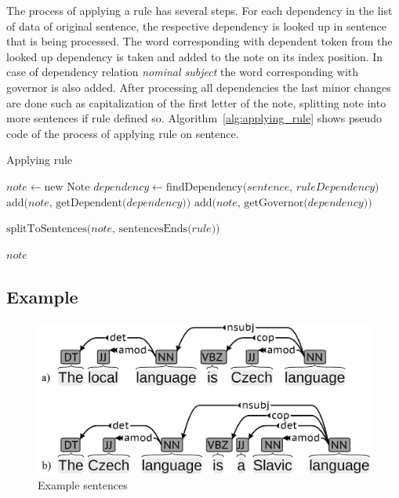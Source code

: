 \documentclass{iitsrc}
\begin{document}
		The process of applying a rule has several steps. For each dependency in the list of data of original sentence, the respective dependency is looked up in sentence that is being processed. The word corresponding with dependent token from the looked up dependency is taken and added to the note on its index position. In case of dependency relation \textit{nominal subject} the word corresponding with governor is also added. After processing all dependencies the last minor changes are done such as capitalization of the first letter of the note, splitting note into more sentences if rule defined so. Algorithm~\ref{alg:applying_rule} shows pseudo code of the process of applying rule on sentence.
	
		\begin{algorithm}
			\caption{Applying rule}\label{alg:applying_rule}
			\begin{algorithmic}[1]
				\State $note \gets \text{new Note}$
				\State $dependency \gets \text{findDependency(} sentence \text{, } ruleDependency \text{)}$
				\State $\text{add(} note \text{, getDependent(} dependency \text{))}$
				\State $\text{add(} note \text{, getGovernor(} dependency \text{))}$
				\EndIf
				\EndIf
				\EndFor
				
				\State $\text{splitToSentences(} note \text{, sentencesEnds(} rule \text{))}$	
				
				\Return $note$
				\EndProcedure
			\end{algorithmic}
		\end{algorithm}
	
	\subsection{Example} \label{subsec:example}
		\begin{figure}[h]
			\begin{center}
				\includegraphics[scale=0.2]{sentences_bw}
				\caption{Example sentences}
				\label{fig:sentences}
			\end{center}
		\end{figure}
		
\end{document}
